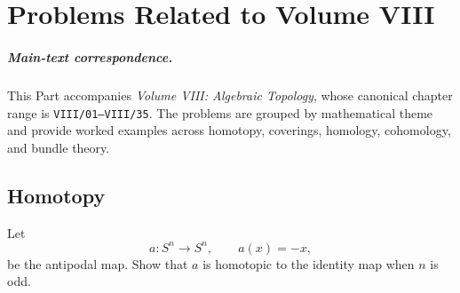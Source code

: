 \chapter{Problems Related to Volume VIII}
\label{ch:companion-viii}

\paragraph{Main-text correspondence.}
This Part accompanies \emph{Volume VIII: Algebraic Topology}, whose canonical chapter range is \texttt{VIII/01--VIII/35}. The problems are grouped by mathematical theme and provide worked examples across homotopy, coverings, homology, cohomology, and bundle theory.


\section{Homotopy}

\begin{problem}
Let
\[
a:S^n\to S^n,\qquad a(x)=-x,
\]
be the antipodal map. Show that \(a\) is homotopic to the identity map when \(n\) is odd.
\end{problem}

